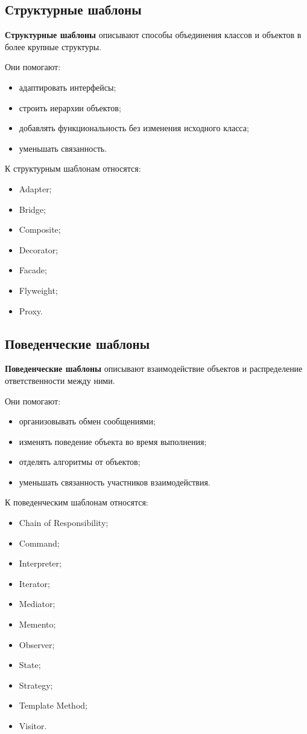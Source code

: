\documentclass[12pt,a4paper]{article}
\begin{document}
\subsection{Структурные шаблоны}

\textbf{Структурные шаблоны} описывают способы объединения классов и объектов в более крупные структуры.

Они помогают:
\begin{itemize}
    \item адаптировать интерфейсы;
    \item строить иерархии объектов;
    \item добавлять функциональность без изменения исходного класса;
    \item уменьшать связанность.
\end{itemize}

К структурным шаблонам относятся:
\begin{itemize}
    \item Adapter;
    \item Bridge;
    \item Composite;
    \item Decorator;
    \item Facade;
    \item Flyweight;
    \item Proxy.
\end{itemize}

\subsection{Поведенческие шаблоны}

\textbf{Поведенческие шаблоны} описывают взаимодействие объектов и распределение ответственности между ними.

Они помогают:
\begin{itemize}
    \item организовывать обмен сообщениями;
    \item изменять поведение объекта во время выполнения;
    \item отделять алгоритмы от объектов;
    \item уменьшать связанность участников взаимодействия.
\end{itemize}

К поведенческим шаблонам относятся:
\begin{itemize}
    \item Chain of Responsibility;
    \item Command;
    \item Interpreter;
    \item Iterator;
    \item Mediator;
    \item Memento;
    \item Observer;
    \item State;
    \item Strategy;
    \item Template Method;
    \item Visitor.
\end{itemize}
\end{document}
